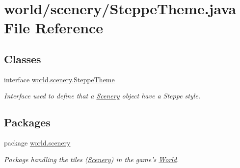 \hypertarget{a00073}{\section{world/scenery/\-Steppe\-Theme.java File Reference}
\label{a00073}
}
\subsection*{Classes}
\begin{DoxyCompactItemize}
\item 
interface \hyperlink{a00027}{world.\-scenery.\-Steppe\-Theme}
\begin{DoxyCompactList}\small\item\em Interface used to define that a \hyperlink{a00024}{Scenery} object have a Steppe style. \end{DoxyCompactList}\end{DoxyCompactItemize}
\subsection*{Packages}
\begin{DoxyCompactItemize}
\item 
package \hyperlink{a00091}{world.\-scenery}
\begin{DoxyCompactList}\small\item\em Package handling the tiles (\hyperlink{a00024}{Scenery}) in the game's \hyperlink{a00039}{World}. \end{DoxyCompactList}\end{DoxyCompactItemize}
